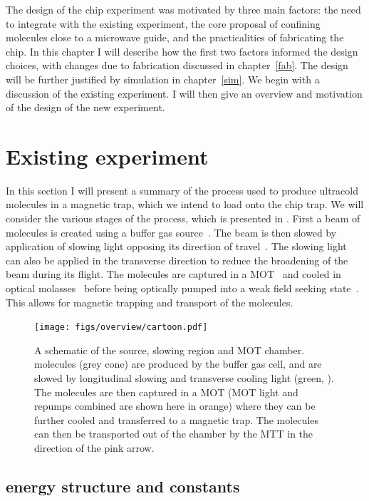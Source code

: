 The design of the \CaF{} chip experiment was motivated by three main factors:
the need to integrate with the existing experiment, the core proposal of
confining molecules close to a microwave guide, and the practicalities of
fabricating the chip. In this chapter I will describe how the first two factors
informed the design choices, with changes due to fabrication discussed in
chapter~\ref{fab}. The design will be further justified by simulation in
chapter~\ref{sim}.
%
We begin with a discussion of the existing experiment. I will then give an
overview and motivation of the design of the new experiment.


\section{Existing \CaF{} experiment}

In this section I will present a summary of the process used to produce
ultracold \CaF{} molecules in a magnetic trap, which we intend to load onto the
chip trap. We will consider the various stages of the process, which is
presented in . First a beam of \CaF{}
molecules is created using a buffer gas
source~\cite{doi:10.1080/09500340.2017.1384516}. The beam is then slowed by
application of slowing light opposing its direction of
travel~\cite{Truppe2017a}. The slowing light can also be applied in the
transverse direction to reduce the broadening of the beam during its flight.
The molecules are captured in a MOT~\cite{Williams2017} and cooled in optical
molasses~\cite{Truppe2017} before being optically pumped into a weak field
seeking state~\cite{WilliamsMagnetic2018}. This allows for magnetic trapping
and transport of the molecules.

\begin{figure}
  \centering
  \texttt{[image: figs/overview/cartoon.pdf]}
  \caption{A schematic of the \CaF{} source, slowing region and MOT chamber.
  \CaF{} molecules (grey cone) are produced by the buffer gas cell, and are
  slowed by longitudinal slowing and transverse cooling light (green,
  ). The molecules are then captured in a MOT (MOT light
   and repumps combined are shown here in orange) where
  they can be further cooled and transferred to a magnetic trap. The molecules
  can then be transported out of the chamber by the MTT in the direction of the
  pink arrow.}
  \label{overview:fig:CaFcartoon}
\end{figure}

\subsection*{\CaF{} energy structure and constants}

